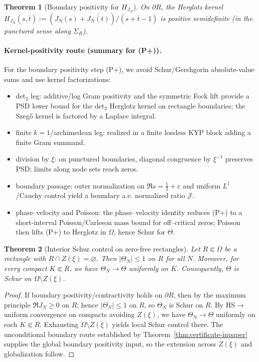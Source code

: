 \documentclass[11pt]{article}
\newtheorem{theorem}{Theorem}
\theoremstyle{definition}
\theoremstyle{remark}
\DeclareMathOperator{\dettwo}{det_2}
\begin{document}
\begin{theorem}[Boundary positivity for \(H_{J_N}\)]\label{thm:boundary-psd-formal}
On \(\partial R\), the Herglotz kernel \(H_{J_N}(s,\overline t):=(J_N(s)+\overline{J_N(t)})/(s+\overline t-1)\) is positive semidefinite (in the punctured sense along \(\Sigma_R\)).
\end{theorem}

\paragraph{Kernel-positivity route (summary for (P+)).}
For the boundary positivity step (P+), we avoid Schur/Gershgorin absolute-value sums and use kernel factorizations:
\begin{itemize}
 \item det$_2$ leg: additive/log Gram positivity and the symmetric Fock lift provide a PSD lower bound for the det$_2$ Herglotz kernel on rectangle boundaries; the Szeg\H{o} kernel is factored by a Laplace integral.
 \item finite $k{=}1$/archimedean leg: realized in a finite lossless KYP block adding a finite Gram summand.
 \item division by $\xi$: on punctured boundaries, diagonal congruence by $\xi^{-1}$ preserves PSD; limits along node sets reach zeros.
 \item boundary passage: outer normalization on $\Re s=\tfrac12+\varepsilon$ and uniform $L^1$/Cauchy control yield a boundary a.e. normalized ratio $\mathcal J$.
 \item phase–velocity and Poisson: the phase–velocity identity reduces (P+) to a short-interval Poisson/Carleson mass bound for off–critical zeros; Poisson then lifts (P+) to Herglotz in $\Omega$, hence Schur for $\Theta$.
\end{itemize}
\begin{theorem}[Interior Schur control on zero-free rectangles]\label{thm:UIC}
Let \(R\Subset\Omega\) be a rectangle with \(R\cap Z(\xi)=\varnothing\). Then \(|\Theta_N|\le 1\) on \(R\) for all \(N\). Moreover, for every compact \(K\Subset R\), we have \(\Theta_N\to\Theta\) uniformly on \(K\). Consequently, \(\Theta\) is Schur on \(\Omega\setminus Z(\xi)\).
\end{theorem}
\begin{proof}
If boundary positivity/contractivity holds on \(\partial R\), then by the maximum principle \(\Re J_N\ge0\) on \(R\); hence \(|\Theta_N|\le 1\) on \(R\), so \(\Theta_N\) is Schur on \(R\). By HS\(\to\)\(\dettwo\) uniform convergence on compacts avoiding \(Z(\xi)\), we have \(\Theta_N\to\Theta\) uniformly on each \(K\Subset R\). Exhausting \(\Omega\setminus Z(\xi)\) yields local Schur control there. The unconditional boundary route established by Theorem~\ref{thm:certificate-inpaper} supplies the global boundary positivity input, so the extension across \(Z(\xi)\) and globalization follow.
\end{proof}
\end{document}
